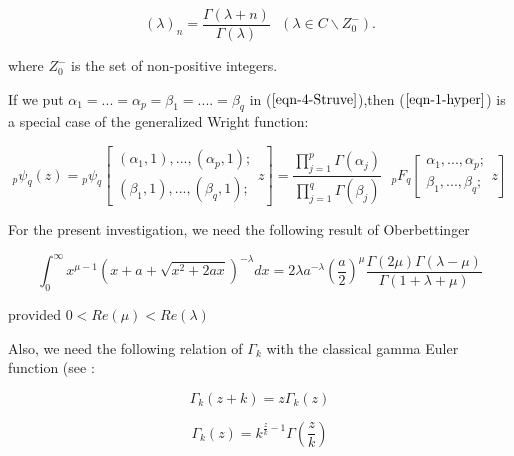 \documentclass{amsart}
\theoremstyle{plain}
\numberwithin{equation}{section}
\begin{document}
\begin{equation}
\left( \lambda \right) _{n}=\frac{\Gamma \left( \lambda +n\right) }{\Gamma
\left( \lambda \right) }\text{ \ \ \ \ \ \ \ \ \ \ }\left( \lambda \in
C\backslash Z_{0}^{-}\right) .  \label{eqn-2b-hyper}
\end{equation}

where $Z_{0}^{-}$ is the set of non-positive integers.

If we put $\alpha _{1}=...=\alpha _{p}=\beta _{1}=....=\beta _{q} $ in ($\ref{eqn-4-Struve}$),then ($\ref{eqn-1-hyper}$) is a special case of the
generalized Wright function:

\begin{equation}
{}_{p}\psi _{q}(z)={}_{p}\psi _{q}\left[ 
\begin{array}{c}
\left( \alpha _{1},1\right) ,...,\left( \alpha _{p},1\right) ; \\ 
\left( \beta _{1},1\right) ,...,\left( \beta _{q},1\right) ;\end{array}z\right] =\dfrac{\prod_{j=1}^{p}\Gamma (\alpha _{j})}{\prod_{j=1}^{q}\Gamma
(\beta _{j})}\text{ }_{p}F_{q}\left[ 
\begin{array}{c}
\alpha _{1},...,\alpha _{p}; \\ 
\beta _{1},...,\beta _{q};\end{array}z\right]  \label{eqn-3-hyper}
\end{equation}

For the present investigation, we need the following result of Oberbettinger 
\cite{Ober}

\begin{equation}
\int_{0}^{\infty }x^{\mu -1}\left( x+a+\sqrt{x^{2}+2ax}\right) ^{-\lambda
}dx=2\lambda a^{-\lambda }\left( \frac{a}{2}\right) ^{\mu }\frac{\Gamma
\left( 2\mu \right) \Gamma \left( \lambda -\mu \right) }{\Gamma \left(
1+\lambda +\mu \right) }  \label{eqn-int1}
\end{equation}

provided $0<Re\left( \mu \right) <Re\left( \lambda \right) $

Also, we need the following relation of $\Gamma _{k}$ with the classical
gamma Euler function (see \cite{Cerutti}:

\begin{equation}
\Gamma _{k}\left( z+k\right) =z\Gamma _{k}\left( z\right)  \label{k5}
\end{equation}

\begin{equation}
\Gamma _{k}\left( z\right) =k^{\frac{z}{k}-1}\Gamma \left( \frac{z}{k}\right)
\label{k6}
\end{equation}
\end{document}
